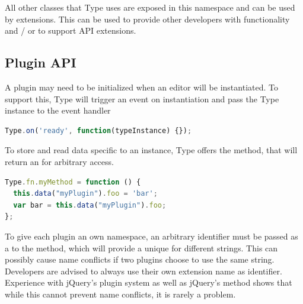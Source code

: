 
\noindent All other classes that Type uses are exposed in this namespace and can be used by extensions. This can be used to provide other developers with functionality and / or to support API extensions.

\subsection{Plugin API}

A plugin may need to be initialized when an editor will be instantiated. To support this, Type will trigger an event on instantiation and pass the Type instance to the event handler

\begin{lstlisting}[language=JavaScript, caption=Example event handler for a Type instantiation, label=lst:instantiation_even_handler_example]
Type.on('ready', function(typeInstance) {});
\end{lstlisting}

\noindent To store and read data specific to an instance, Type offers the  method, that will return an  for arbitrary access.

\begin{lstlisting}[language=JavaScript, caption=Example calls to format text, label=lst:format-examples]
Type.fn.myMethod = function () {
  this.data("myPlugin").foo = 'bar';
  var bar = this.data("myPlugin").foo;
};
\end{lstlisting}

\noindent To give each plugin an own namespace, an arbitrary identifier must be passed as a  to the  method, which will provide a unique  for different strings. This can possibly cause name conflicts if two plugins choose to use the same string. Developers are advised to always use their own extension name as identifier. Experience with jQuery's plugin system as well as jQuery's  method shows that while this cannot prevent name conflicts, it is rarely a problem.


